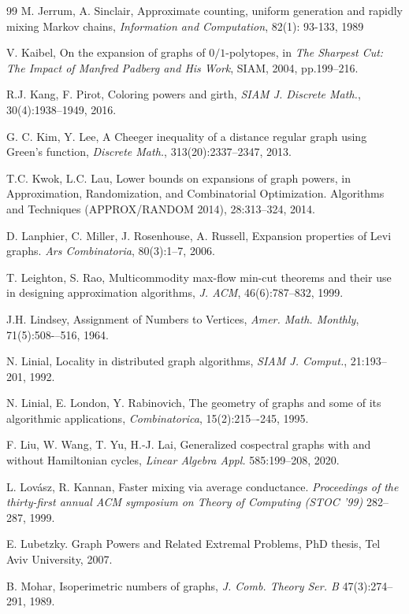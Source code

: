 \documentclass[a4paper,11pt]{article}
\theoremstyle{definition}
\begin{document}
\begin{thebibliography}{99}
 M. Jerrum, A. Sinclair, Approximate counting, uniform generation and rapidly mixing Markov chains, \emph{Information and Computation}, 82(1): 93-133, 1989

 V. Kaibel, On the expansion of graphs of $0/1$-polytopes, in \emph{The Sharpest Cut: The Impact of Manfred Padberg and His Work}, SIAM, 2004, pp.199--216.

 R.J. Kang, F. Pirot, Coloring powers and girth, \emph{SIAM J. Discrete Math.}, 30(4):1938--1949, 2016.

 G. C. Kim, Y. Lee, A Cheeger inequality of a distance regular graph using Green's function, \emph{Discrete Math.}, 313(20):2337--2347, 2013.


 T.C. Kwok, L.C. Lau, Lower bounds on expansions of graph powers, in Approximation, Randomization, and Combinatorial Optimization. Algorithms and Techniques (APPROX/RANDOM 2014), 28:313--324, 2014.

 D. Lanphier, C. Miller, J. Rosenhouse, A. Russell, Expansion properties of Levi graphs. \emph{Ars Combinatoria}, 80(3):1--7, 2006.


 T. Leighton, S. Rao, Multicommodity max-flow min-cut theorems and their use in designing approximation algorithms, \emph{J. ACM}, 46(6):787--832, 1999.


 J.H. Lindsey, Assignment of Numbers to Vertices, \emph{Amer. Math. Monthly}, 71(5):508-–516, 1964.

 N. Linial, Locality in distributed graph algorithms, \textit{SIAM J. Comput.}, 21:193--201, 1992.

 N. Linial, E. London, Y. Rabinovich, The geometry of graphs and some of its algorithmic applications, \emph{Combinatorica}, 15(2):215–-245, 1995.

 F. Liu, W. Wang, T. Yu, H.-J. Lai, Generalized cospectral graphs with and without Hamiltonian cycles, \emph{Linear Algebra Appl.} 585:199–208, 2020.

 L. Lovász, R. Kannan, Faster mixing via average conductance. \emph{Proceedings of the thirty-first annual ACM symposium on Theory of Computing (STOC '99)} 282–287, 1999.

 E. Lubetzky. 
Graph Powers and Related Extremal Problems, PhD thesis, Tel Aviv University, 2007.

B. Mohar, Isoperimetric numbers of graphs, \emph{J. Comb. Theory Ser. B} 47(3):274--291, 1989.


\end{thebibliography}
\end{document}

